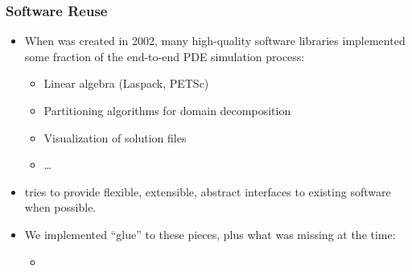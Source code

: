 \frame
{
  \frametitle{Software Reuse}
  \begin{itemize}
    \item When \libMesh{} was created in 2002, many high-quality
      software libraries implemented some fraction of the end-to-end PDE simulation process:
      \begin{itemize}
        \item Linear algebra (Laspack, PETSc)
        \item Partitioning algorithms for domain decomposition
        \item Visualization of solution files
        \item \ldots
      \end{itemize}
    \item \libMesh{} tries to provide flexible, extensible, abstract interfaces to existing software when possible.
    \item We implemented ``glue'' to these pieces, plus what was missing at the time:
      \begin{itemize}
        \item {}
      \end{itemize}          
  \end{itemize}  
}




